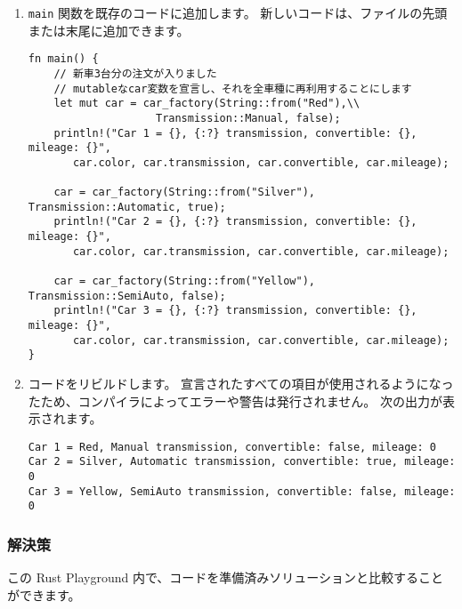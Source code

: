 \begin{enumerate}
\item \texttt{main} 関数を既存のコードに追加します。 新しいコードは、ファイルの先頭または末尾に追加できます。


\begin{lstlisting}[numbers=none]
fn main() {
    // 新車3台分の注文が入りました
    // mutableなcar変数を宣言し、それを全車種に再利用することにします
    let mut car = car_factory(String::from("Red"),\\
                    Transmission::Manual, false);
    println!("Car 1 = {}, {:?} transmission, convertible: {}, mileage: {}",
       car.color, car.transmission, car.convertible, car.mileage);

    car = car_factory(String::from("Silver"), Transmission::Automatic, true);
    println!("Car 2 = {}, {:?} transmission, convertible: {}, mileage: {}",
       car.color, car.transmission, car.convertible, car.mileage);

    car = car_factory(String::from("Yellow"), Transmission::SemiAuto, false);
    println!("Car 3 = {}, {:?} transmission, convertible: {}, mileage: {}",
       car.color, car.transmission, car.convertible, car.mileage);    
}
\end{lstlisting}

\item コードをリビルドします。 宣言されたすべての項目が使用されるようになったため、コンパイラによってエラーや警告は発行されません。 次の出力が表示されます。


\begin{lstlisting}[numbers=none]
Car 1 = Red, Manual transmission, convertible: false, mileage: 0
Car 2 = Silver, Automatic transmission, convertible: true, mileage: 0
Car 3 = Yellow, SemiAuto transmission, convertible: false, mileage: 0
\end{lstlisting}

\end{enumerate}

\subsubsection{解決策}

この Rust Playground 内で、コードを準備済みソリューションと比較することができます。